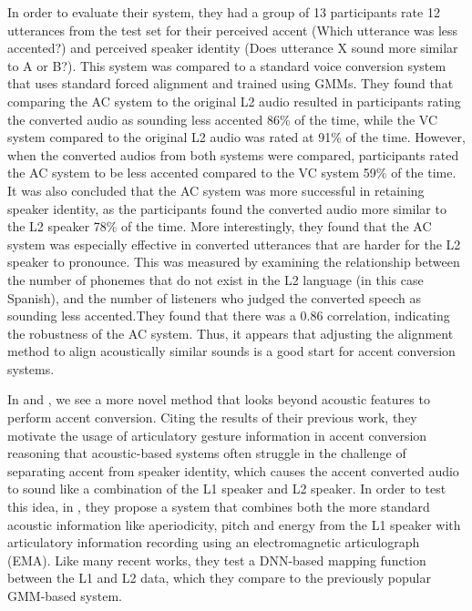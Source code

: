 \documentclass
[
    a4paper,
    twoside,
    12pt,
]
{report}
\begin{document}
In order to evaluate their system, they had a group of 13 participants
rate 12 utterances from the test set for their perceived accent (Which
utterance was less accented?) and perceived speaker identity (Does
utterance X sound more similar to A or B?). This system was compared to
a standard voice conversion system that uses standard forced alignment
and trained using GMMs. They found that comparing the AC system to the
original L2 audio resulted in participants rating the converted audio as
sounding less accented 86\% of the time, while the VC system compared to
the original L2 audio was rated at 91\% of the time. However, when the
converted audios from both systems were compared, participants rated the
AC system to be less accented compared to the VC system 59\% of the
time. It was also concluded that the AC system was more successful in
retaining speaker identity, as the participants found the converted
audio more similar to the L2 speaker 78\% of the time. More
interestingly, they found that the AC system was especially effective in
converted utterances that are harder for the L2 speaker to pronounce.
This was measured by examining the relationship between the number of
phonemes that do not exist in the L2 language (in this case Spanish),
and the number of listeners who judged the converted speech as sounding
less accented.They found that there was a 0.86 correlation, indicating
the robustness of the AC system. Thus, it appears that adjusting the
alignment method to align acoustically similar sounds is a good start
for accent conversion systems.

In \textcite{aryal2014a} and \textcite{aryal2015}, we see a more novel
method that looks beyond acoustic features to perform accent conversion.
Citing the results of their previous work, they motivate the usage of
articulatory gesture information in accent conversion reasoning that
acoustic-based systems often struggle in the challenge of separating
accent from speaker identity, which causes the accent converted audio to
sound like a combination of the L1 speaker and L2 speaker. In order to
test this idea, in \textcite{aryal2015}, they propose a system that
combines both the more standard acoustic information like aperiodicity,
pitch and energy from the L1 speaker with articulatory information
recording using an electromagnetic articulograph (EMA). Like many recent
works, they test a DNN-based mapping function between the L1 and L2
data, which they compare to the previously popular GMM-based system.
\end{document}
